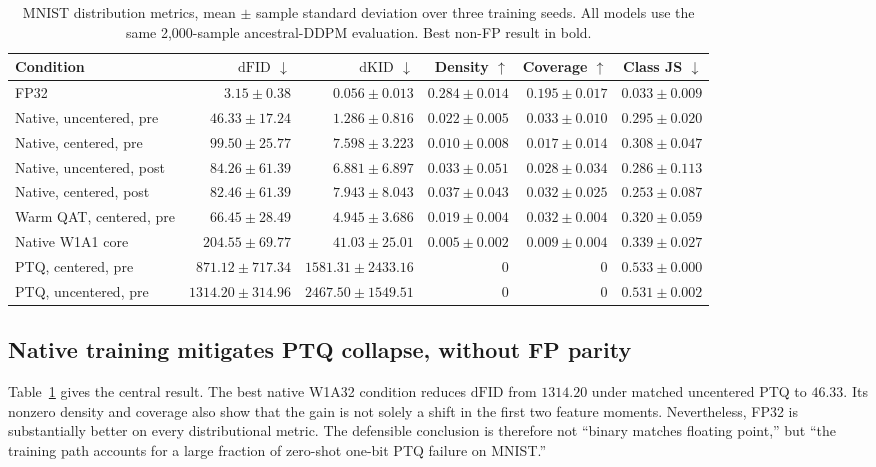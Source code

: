 \documentclass[conference]{IEEEtran}
\newcommand{\dfid}{\ensuremath{\mathrm{dFID}}}
\newcommand{\dkid}{\ensuremath{\mathrm{dKID}}}
\begin{document}
\begin{table}[t]
\centering
\caption{MNIST distribution metrics, mean $\pm$ sample standard deviation over
three training seeds. All models use the same 2,000-sample ancestral-DDPM
evaluation. Best non-FP result in bold.}
\label{tab:mnist}
\small
\begin{tabular}{lrrrrr}
\toprule
Condition & \dfid{} $\downarrow$ & \dkid{} $\downarrow$ & Density $\uparrow$ & Coverage $\uparrow$ & Class JS $\downarrow$ \\
\midrule
FP32 & $3.15\pm0.38$ & $0.056\pm0.013$ & $0.284\pm0.014$ & $0.195\pm0.017$ & $0.033\pm0.009$ \\
Native, uncentered, pre & $\mathbf{46.33\pm17.24}$ & $\mathbf{1.286\pm0.816}$ & $0.022\pm0.005$ & $\mathbf{0.033\pm0.010}$ & $0.295\pm0.020$ \\
Native, centered, pre & $99.50\pm25.77$ & $7.598\pm3.223$ & $0.010\pm0.008$ & $0.017\pm0.014$ & $0.308\pm0.047$ \\
Native, uncentered, post & $84.26\pm61.39$ & $6.881\pm6.897$ & $0.033\pm0.051$ & $0.028\pm0.034$ & $0.286\pm0.113$ \\
Native, centered, post & $82.46\pm61.39$ & $7.943\pm8.043$ & $\mathbf{0.037\pm0.043}$ & $0.032\pm0.025$ & $\mathbf{0.253\pm0.087}$ \\
Warm QAT, centered, pre & $66.45\pm28.49$ & $4.945\pm3.686$ & $0.019\pm0.004$ & $0.032\pm0.004$ & $0.320\pm0.059$ \\
Native W1A1 core & $204.55\pm69.77$ & $41.03\pm25.01$ & $0.005\pm0.002$ & $0.009\pm0.004$ & $0.339\pm0.027$ \\
PTQ, centered, pre & $871.12\pm717.34$ & $1581.31\pm2433.16$ & $0$ & $0$ & $0.533\pm0.000$ \\
PTQ, uncentered, pre & $1314.20\pm314.96$ & $2467.50\pm1549.51$ & $0$ & $0$ & $0.531\pm0.002$ \\
\bottomrule
\end{tabular}
\end{table}

\subsection{Native training mitigates PTQ collapse, without FP parity}

Table~\ref{tab:mnist} gives the central result. The best native W1A32 condition
reduces \dfid{} from $1314.20$ under matched uncentered PTQ to $46.33$. Its
nonzero density and coverage also show that the gain is not solely a shift in the
first two feature moments. Nevertheless, FP32 is substantially better on every
distributional metric. The defensible conclusion is therefore not ``binary
matches floating point,'' but ``the training path accounts for a large fraction
of zero-shot one-bit PTQ failure on MNIST.''
\end{document}
